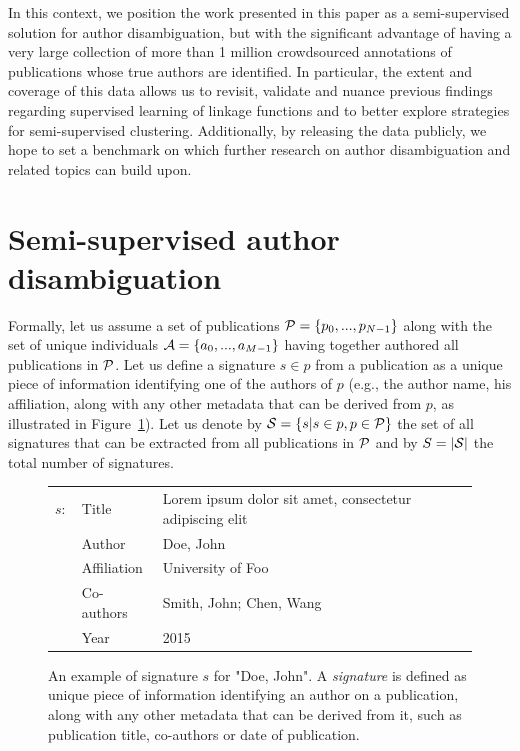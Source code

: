 \documentclass{article}
\begin{document}
In this context, we position the work presented in this paper as a
semi-supervised  solution for author disambiguation, but with the significant
advantage of having a very large collection of more than 1 million crowdsourced annotations
of publications whose true authors are identified. In particular, the extent and coverage
of this data allows us to revisit, validate and nuance previous findings regarding
supervised learning of linkage functions and to better explore strategies
for semi-supervised clustering. Additionally, by releasing the data publicly,
we hope to set a benchmark on which further research on author disambiguation
and related topics can  build upon.




\section{Semi-supervised author disambiguation}
\label{methods}

Formally, let us assume a set of publications ${\cal P} = \{ p_0, ...,
p_{N-1}\}$ along with the set of unique individuals ${\cal A} = \{ a_0, ...,
a_{M-1}\}$ having together authored all publications in ${\cal P}$.  Let us
define a signature $s \in p$ from a publication as a unique piece of
information identifying one of the authors of $p$ (e.g., the author name, his
affiliation, along with any other metadata that can be derived from $p$, as illustrated in Figure~\ref{fig:signature}). Let us
denote by ${\cal S} = \{ s | s \in p, p \in {\cal P} \}$ the set of all
signatures that can be extracted from all publications in ${\cal P}$ and
by $S=|{\cal S}|$ the total number of signatures.

\begin{figure}
\label{fig:signature}
\begin{tabular}{ l l l }
  $s:$ & Title & Lorem ipsum dolor sit amet, consectetur adipiscing elit \\
  & Author & Doe, John \\
  & Affiliation & University of Foo \\
  & Co-authors & Smith, John; Chen, Wang\\
  & Year & 2015\\
\end{tabular}

\caption{An example of signature $s$ for "Doe, John". A \textit{signature} is
defined as unique piece of information identifying an author on a publication,
along with any other metadata that can be derived from it, such as publication
title, co-authors or date of publication.}
\end{figure}
\end{document}

